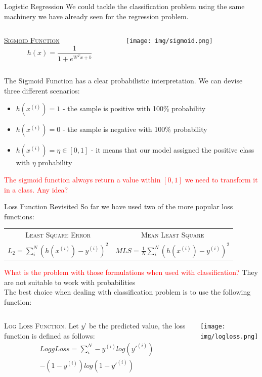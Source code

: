 \documentclass{beamer}
\newcommand{\sample}[2]{#1^{(#2)}}
\begin{document}
\begin{frame}{Logistic Regression}
\small
We could tackle the classification problem using the same machinery we have already seen
for the regression problem.
\vskip 0.2cm
\begin{columns}
\begin{column}{0.5\textwidth}
\underline{\textsc{Sigmoid Function}}
\[
h(x) = \frac{1}{1+e^{W^Tx+b}} 
\]
\end{column}
\begin{column}{0.5\textwidth}
\texttt{[image: img/sigmoid.png]}
\end{column}
\end{columns}
The Sigmoid Function has a clear probabilistic interpretation. We can devise  three different scenarios:
\begin{itemize}
\item $h(\sample{x}{i})=1$ - the sample is positive with 100\% probability
\item $h(\sample{x}{i})=0$ - the sample is negative with 100\% probability
\item $h(\sample{x}{i}) = \eta \in [0,1]$ - it means that our model assigned the positive class with 
$\eta$ probability
\end{itemize}
\pause
\textcolor{red}{The sigmoid function always return a value within $[0,1]$ we need to transform it in a class. Any idea?}
\end{frame}


\begin{frame}{Loss Function Revisited}
\small
So far we have used two of the more popular loss functions:
\vskip 0.3cm
\begin{tabular}{cc}
\textsc{Least Square Error} & \textsc{Mean Least Square} \\[1pt]
$L_2 = \sum_{i}^{N} (h(\sample{x}{i})-\sample{y}{i})^2$ & 
$MLS = \frac{1}{N} \sum_{i}^{N} (h(\sample{x}{i})-\sample{y}{i})^2$
\end{tabular}
\pause 
\vskip 0.5cm
\textcolor{red}{What is the problem with those formulations when used with classification?}
\pause
\vskip 0.2cm
They are not suitable to work with probabilities\\
\vskip 0.2cm
\pause
The best choice when dealing with classification problem is to use the following function:
\vskip 0.25cm
\begin{columns}
\begin{column}{0.5\textwidth}
\textsc{Log Loss Function}. Let $y$' be the
predicted value, the loss function is defined as follows:
\[
\begin{split}
LoggLoss = \sum_{i}^{N} -\sample{y}{i} log(\sample{y'}{i}) \\
-(1-\sample{y}{i}) log(1-\sample{y'}{i})
\end{split}
\]
\end{column}
\begin{column}{0.5\textwidth}
\texttt{[image: img/logloss.png]}
\end{column}
\end{columns} 
\end{frame}
\end{document}
